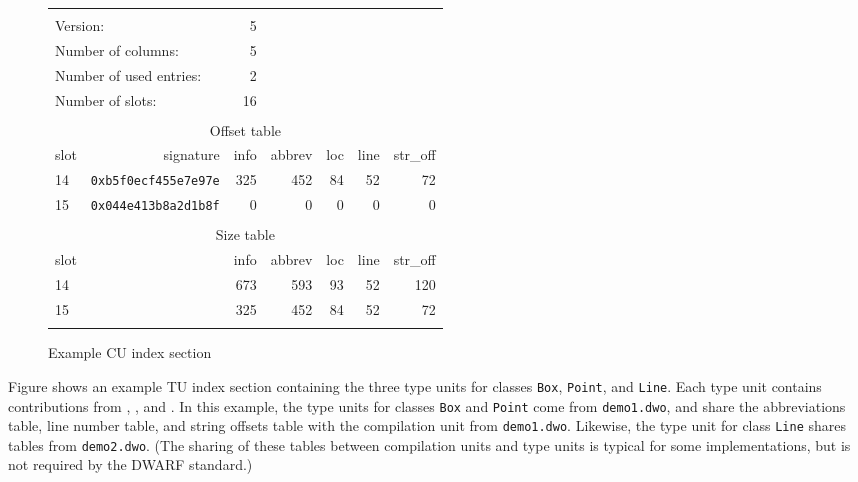 \begin{figure}[h]
\bb
\begin{center}
\begin{tabular}{lrrrrrr}
\hline \\
  \multicolumn{2}{l}{Version:}&                 5 &&&&\\
  \multicolumn{2}{l}{Number of columns:}&       5 &&&&\\
  \multicolumn{2}{l}{Number of used entries:}&  2 &&&&\\
  \multicolumn{2}{l}{Number of slots:}&         16 &&&&\\
\\
  \multicolumn{7}{c}{Offset table} \\
  \hline
  slot&  signature&             info&   abbrev&      loc&     line& str\_off \\
    14& \texttt{0xb5f0ecf455e7e97e}&      325&      452&       84&       52&       72 \\
    15& \texttt{0x044e413b8a2d1b8f}&        0&        0&        0&        0&        0 \\
\\
  \multicolumn{7}{c}{Size table} \\
  \hline
  slot&                    &     info&   abbrev&      loc&     line& str\_off \\
    14&                    &      673&      593&       93&       52&      120 \\
    15&                    &      325&      452&       84&       52&       72 \\
\\ \hline 
\end{tabular}
\end{center}
\caption{Example CU index section}
\label{fig:examplecuindexsection}
\eb
\end{figure}

\bb
Figure  
shows an example TU index section containing the
three type units for classes \texttt{Box}, \texttt{Point}, and 
\texttt{Line}. Each type unit
contains contributions from \dotdebuginfodwo{}, \dotdebugabbrevdwo{},
\dotdebuglinedwo{} and \dotdebugstroffsetsdwo{}. In this example, the
type units for classes \texttt{Box} and \texttt{Point} come from 
\texttt{demo1.dwo}, and
share the abbreviations table, line number table, and string
offsets table with the compilation unit from \texttt{demo1.dwo}. 
Likewise, the type unit for class \texttt{Line} shares tables 
from \texttt{demo2.dwo}. (The
sharing of these tables between compilation units and type units
is typical for some implementations, but is not required by the
DWARF standard.)
\eb

